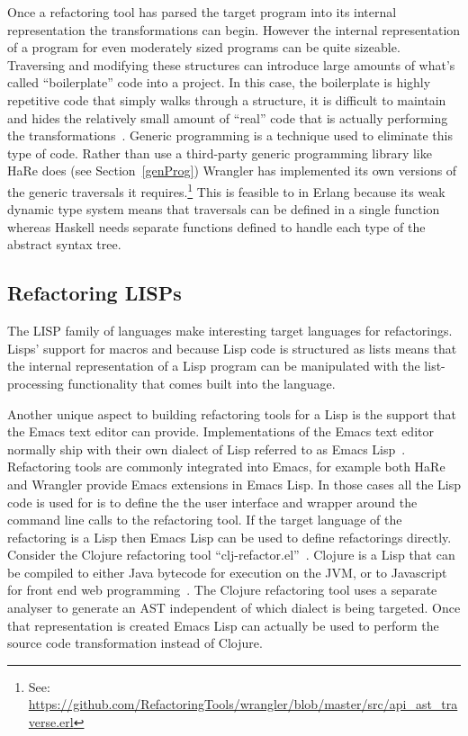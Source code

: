 Once a refactoring tool has parsed the target program into its internal representation the transformations can begin. However the internal representation of a program for even moderately sized programs can be quite sizeable. Traversing and modifying these structures can introduce large amounts of what's called ``boilerplate'' code into a project. In this case, the boilerplate is highly repetitive code that simply walks through a structure, it is difficult to maintain and hides the relatively small amount of ``real'' code that is actually performing the transformations~\citep{syb}. Generic programming is a technique used to eliminate this type of code. Rather than use a third-party generic programming library like HaRe does (see Section~\ref{genProg}) Wrangler has implemented its own versions of the generic traversals it requires.\footnote{See: \url{https://github.com/RefactoringTools/wrangler/blob/master/src/api_ast_traverse.erl}} This is feasible to in Erlang because its weak dynamic type system means that traversals can be defined in a single function whereas Haskell needs separate functions defined to handle each type of the abstract syntax tree. 

\subsection{Refactoring LISPs}

The LISP family of languages make interesting target languages for refactorings. Lisps' support for macros and because Lisp code is structured as lists means that the internal representation of a Lisp program can be manipulated with the list-processing functionality that comes built into the language. 

Another unique aspect to building refactoring tools for a Lisp is the support that the Emacs text editor can provide. Implementations of the Emacs text editor normally ship with their own dialect of Lisp referred to as Emacs Lisp~\citep{emacs}. Refactoring tools are commonly integrated into Emacs, for example both HaRe and Wrangler provide Emacs extensions in Emacs Lisp. In those cases all the Lisp code is used for is to define the the user interface and wrapper around the command line calls to the refactoring tool. If the target language of the refactoring is a Lisp then Emacs Lisp can be used to define refactorings directly. Consider the Clojure refactoring tool ``clj-refactor.el''~\citep{clojureRefac}. Clojure is a Lisp that can be compiled to either Java bytecode for execution on the JVM, or to Javascript for front end web programming~\citep{clojure}. The Clojure refactoring tool uses a separate analyser to generate an AST independent of which dialect is being targeted. Once that representation is created Emacs Lisp can actually be used to perform the source code transformation instead of Clojure.    

